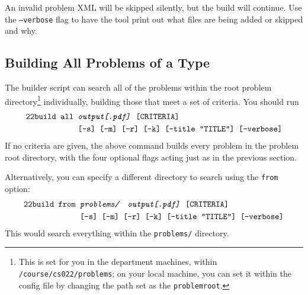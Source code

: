     An invalid problem XML will be skipped silently, but the build will
    continue. Use the \texttt{--verbose} flag to have the tool print out 
    what files are being added or skipped and why.
  \subsection{Building All Problems of a Type}
    The builder script can search all of the problems within the root problem 
    directory\footnote{This is set for you in the department machines, within 
    \texttt{/course/cs022/problems}; on your local machine, you can set it 
    within the config file by changing the path set as the 
    \texttt{problemroot}.} 
    individually, building those that meet a set of criteria. You should run
    \begin{align*}
      \texttt{22build }\texttt{all }&\texttt{\textit{output[.pdf]} [CRITERIA]}\\
      ~&\texttt{[-s] [-m] [-r] [-k] [--title ``TITLE''] [--verbose]}
    \end{align*}
    If no criteria are given, the above command builds every problem in 
    the problem root directory, with the four optional flags acting just 
    as in the previous section.
    
    Alternatively, you can specify a different directory to search using 
    the \texttt{from} option:
    \begin{align*}
      \pybuild\texttt{from }&\texttt{\textit{problems/\ \ output[.pdf]} [CRITERIA]}\\
      ~&\texttt{[-s] [-m] [-r] [-k] [--title ``TITLE''] [--verbose]}
    \end{align*}
    This would search everything within the \texttt{problems/} directory.
    
